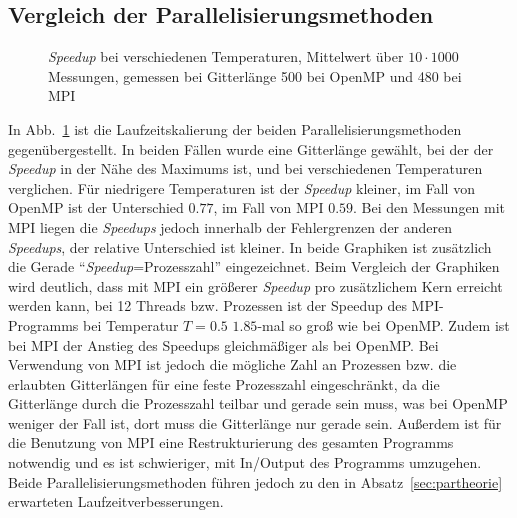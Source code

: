 \subsection{Vergleich der Parallelisierungsmethoden}
%	
	\begin{figure}[htbp]
		
		\caption[\textit{Speedup}  bei verschiedenen Temperaturen]{\textit{Speedup} bei verschiedenen Temperaturen, Mittelwert über $10 \cdot 1000$ Messungen, gemessen bei Gitterlänge 500 bei OpenMP und 480 bei MPI}
		\label{fig:skalierungtemp}
	\end{figure}
	
	In Abb.~\ref{fig:skalierungtemp} ist die Laufzeitskalierung der beiden Parallelisierungsmethoden gegenübergestellt. 
	In beiden Fällen wurde eine Gitterlänge gewählt, bei der der \textit{Speedup} in der Nähe des Maximums ist, und bei verschiedenen Temperaturen verglichen. Für niedrigere Temperaturen ist der \textit{Speedup} kleiner, im Fall von OpenMP ist der Unterschied $\num{0,77}$, im Fall von MPI $\num{0,59}$. Bei den Messungen mit MPI liegen die \textit{Speedups} jedoch innerhalb der Fehlergrenzen der anderen \textit{Speedups}, der relative Unterschied ist kleiner.
	In beide Graphiken ist zusätzlich die Gerade \enquote{\textit{Speedup}=Prozesszahl} eingezeichnet.
	Beim Vergleich der Graphiken wird deutlich, dass mit MPI ein größerer \textit{Speedup} pro zusätzlichem Kern erreicht werden kann, bei 12 Threads bzw. Prozessen ist der Speedup des MPI-Programms bei Temperatur $T=\num{0,5}$ $\num{1,85}$-mal so groß wie bei OpenMP. Zudem ist bei MPI der Anstieg des Speedups gleichmäßiger als bei OpenMP. Bei Verwendung von MPI ist jedoch die mögliche Zahl an Prozessen bzw.{} die erlaubten Gitterlängen für eine feste Prozesszahl eingeschränkt, da die Gitterlänge durch die Prozesszahl teilbar und gerade sein muss, was bei OpenMP weniger der Fall ist, dort muss die Gitterlänge nur gerade sein. Außerdem ist für die Benutzung von MPI eine Restrukturierung des gesamten Programms notwendig und es ist schwieriger, mit In/Output des Programms umzugehen. Beide Parallelisierungsmethoden führen jedoch zu den in Absatz~\ref{sec:partheorie} erwarteten Laufzeitverbesserungen.
